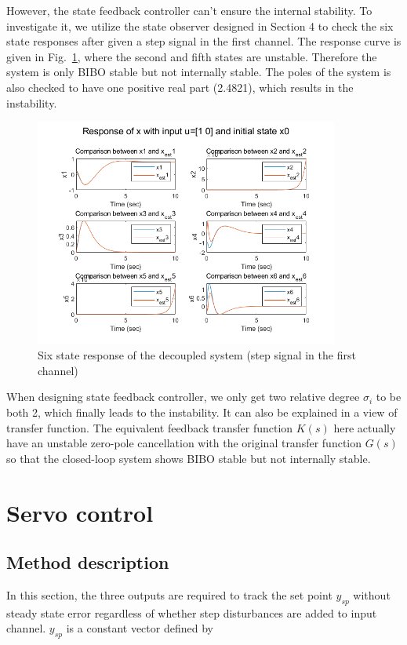 \documentclass[hyperref]{article}
\theoremstyle{nonumberplain}
\begin{document}
	However, the state feedback controller can't ensure the internal stability. To investigate it, we utilize the state observer designed in Section 4 to check the six state responses after given a step signal in the first channel. The response curve is given in Fig.~\ref{fig23}, where the second and fifth states are unstable. Therefore the system is only BIBO stable but not internally stable. The poles of the system is also checked to have one positive real part (2.4821), which results in the instability.
	
	 \begin{figure}[H]
	 	\centering
	 	\includegraphics[width=10cm]{fig36.png}
	 	\caption{Six state response of the decoupled system (step signal in the first channel)}
	 	\label{fig23}
	 \end{figure}
	
	 When designing state feedback controller, we only get two relative degree $\sigma_{i}$ to be both 2, which finally leads to the instability. It can also be explained in a view of transfer function. The equivalent feedback transfer function $K(s)$ here actually have an unstable zero-pole cancellation with the original transfer function $G(s)$ so that the closed-loop system shows BIBO stable but not internally stable.
	
	
	\section{Servo control}
	
	\subsection{Method description}
	
	\hspace{1.0em}
	In this section, the three outputs are required to track the set point $y_{sp}$ without steady state error regardless of whether step disturbances are added to input channel. $y_{sp}$ is a constant vector defined by
	
\end{document}
